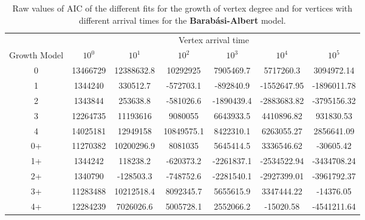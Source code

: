 \begin{table}[H]
\centering
\begin{tabular}{ccccccc}
                                  & \multicolumn{6}{c}{Vertex arrival time}                                     \\
\multicolumn{1}{c|}{Growth Model} & $10^0$   & $10^1$     & $10^2$     & $10^3$     & $10^4$      & $10^5$      \\ \hline
\multicolumn{1}{c|}{0}            & 13466729 & 12388632.8 & 10292925   & 7905469.7  & 5717260.3   & 3094972.14  \\
\multicolumn{1}{c|}{1}            & 1344240  & 330512.7   & -572703.1  & -892840.9  & -1552647.95 & -1896011.78 \\
\multicolumn{1}{c|}{2}            & 1343844  & 253638.8   & -581026.6  & -1890439.4 & -2883683.82 & -3795156.32 \\
\multicolumn{1}{c|}{3}            & 12264735 & 11193616   & 9080055    & 6643933.5  & 4410896.82  & 931830.53   \\
\multicolumn{1}{c|}{4}            & 14025181 & 12949158   & 10849575.1 & 8422310.1  & 6263055.27  & 2856641.09  \\
\multicolumn{1}{c|}{0+}           & 11270382 & 10200296.9 & 8081035    & 5645414.5  & 3336546.62  & -30605.42   \\
\multicolumn{1}{c|}{1+}           & 1344242  & 118238.2   & -620373.2  & -2261837.1 & -2534522.94 & -3434708.24 \\
\multicolumn{1}{c|}{2+}           & 1340790  & -128503.3  & -748752.6  & -2281540.1 & -2927399.01 & -3961792.37 \\
\multicolumn{1}{c|}{3+}           & 11283488 & 10212518.4 & 8092345.7  & 5655615.9  & 3347444.22  & -14376.05   \\
\multicolumn{1}{c|}{4+}           & 12284239 & 7026026.6  & 5005728.1  & 2552066.2  & -15020.58   & -4541211.64
\end{tabular}
\caption{Raw values of AIC of the different fits for the growth of vertex degree and for vertices with different arrival times for the \textbf{Barabási-Albert} model.}
\label{tab:BA_evolution_AIC}
\end{table}




